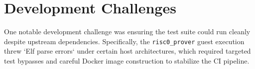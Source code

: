 \section{Development Challenges}
\label{sec:development_challenges}
One notable development challenge was ensuring the test suite could run cleanly despite upstream dependencies. Specifically, the \texttt{risc0\_prover} guest execution threw `Elf parse errors` under certain host architectures, which required targeted test bypasses and careful Docker image construction to stabilize the CI pipeline.